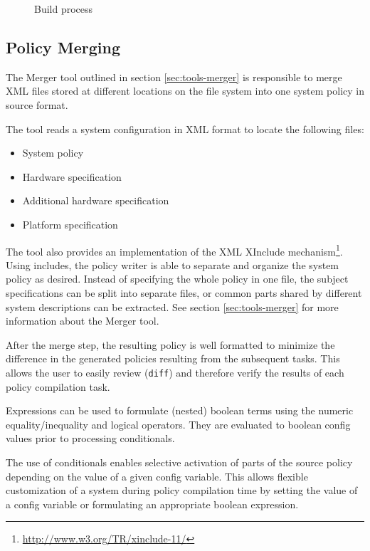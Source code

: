 \documentclass[a4paper,twoside,titlepage]{article}
\begin{document}
\begin{figure}[h!]
	\centering
	
	\caption{Build process}
	\label{fig:build-process}
\end{figure}

\subsection{Policy Merging}
\label{sec:build-policy_merging}
The Merger tool outlined in section \ref{sec:tools-merger} is responsible to
merge XML files stored at different locations on the file system into one
system policy in source format.

The tool reads a system configuration in XML format to locate the following
files:
\begin{itemize}
	\item System policy
	\item Hardware specification
	\item Additional hardware specification
	\item Platform specification
\end{itemize}

The tool also provides an implementation of the XML XInclude
mechanism\footnote{\url{http://www.w3.org/TR/xinclude-11/}}. Using includes,
the policy writer is able to separate and organize the system policy as
desired. Instead of specifying the whole policy in one file, the subject
specifications can be split into separate files, or common parts shared by
different system descriptions can be extracted. See section
\ref{sec:tools-merger} for more information about the Merger tool.

After the merge step, the resulting policy is well formatted to minimize the
difference in the generated policies resulting from the subsequent tasks. This
allows the user to easily review (\texttt{diff}) and therefore verify the
results of each policy compilation task.

Expressions can be used to formulate (nested) boolean terms using the numeric
equality/inequality and logical operators. They are evaluated to boolean config
values prior to processing conditionals.

The use of conditionals enables selective activation of parts of the source
policy depending on the value of a given config variable. This allows flexible
customization of a system during policy compilation time by setting the value
of a config variable or formulating an appropriate boolean expression.
\end{document}
